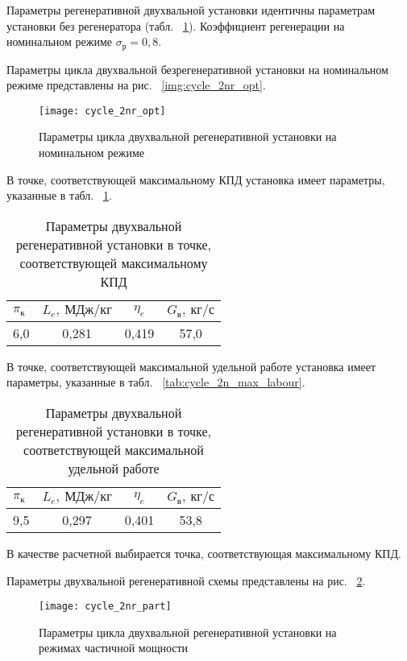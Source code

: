 Параметры регенеративной двухвальной установки идентичны параметрам установки без регенератора (табл. ~\ref{img:cycle_2n_opt}). Коэффициент регенерации на номинальном режиме $\sigma_р = 0,8$.

Параметры цикла двухвальной безрегенеративной установки на номинальном режиме представлены на рис. ~\ref{img:cycle_2nr_opt}.

\begin{figure}[H]
	\centering
	\texttt{[image: cycle\_2nr\_opt]}
	\caption{Параметры цикла двухвальной регенеративной установки на номинальном режиме}
	\label{img:cycle_2n_opt}
\end{figure}

В точке, соответствующей максимальному КПД установка имеет параметры, указанные в табл. ~\ref{tab:cycle_2nr_max_eta}.

\begin{longtable}{|p{7cm}|c|c|c|}
	\caption{Параметры двухвальной регенеративной установки в точке, соответствующей максимальному КПД}
	\label{tab:cycle_2nr_max_eta}
	\hline
	\textbf{$\pi_к$} & \textbf{$L_e, \ МДж/кг$} & \textbf{$\eta_e$} & \textbf{$G_в, \ кг/с$} \\ \hline
	6,0 & 0,281 & 0,419 & 57,0 \\ \hline
\end{longtable}


В точке, соответствующей максимальной удельной работе установка имеет параметры, указанные в табл. ~\ref{tab:cycle_2n_max_labour}.
\begin{longtable}{|p{7cm}|c|c|c|}
	\caption{Параметры двухвальной регенеративной установки в точке, соответствующей максимальной удельной работе}
	\label{tab:cycle_2nr_max_labour}
	\hline
	\textbf{$\pi_к$} & \textbf{$L_e, \ МДж/кг$} & \textbf{$\eta_e$} & \textbf{$G_в, \ кг/с$} \\ \hline
	9,5 & 0,297 & 0,401 & 53,8 \\ \hline
\end{longtable}

В качестве расчетной выбирается точка, соответствующая максимальному КПД.

Параметры двухвальной регенеративной схемы представлены на рис. ~\ref{img:cycle_2nr_part}.

\begin{figure}[H]
	\centering
	\texttt{[image: cycle\_2nr\_part]}
	\caption{Параметры цикла двухвальной регенеративной установки на режимах частичной мощности}
	\label{img:cycle_2nr_part}
\end{figure}

